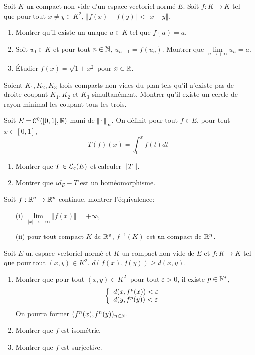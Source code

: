 \begin{exercise}
	Soit $K$ un compact non vide d'un espace vectoriel normé $E$. Soit $f\colon K\to K$ tel que pour tout $x\neq y\in K^{2}$, $\Vert f(x)-f(y)\Vert<\Vert x-y\Vert$.
	\begin{enumerate}
		\item Montrer qu'il existe un unique $a\in K$ tel que $f(a)=a$.
		\item Soit $u_{0}\in K$ et pour tout $n\in\mathbb{N}$, $u_{n+1}=f(u_{n})$. Montrer que $\lim\limits_{n\to+\infty}u_{n}=a$.
		\item Étudier $f(x)=\sqrt{1+x^{2}}$ pour $x\in\mathbb{R}$.
	\end{enumerate}
\end{exercise}

\begin{exercise}
	Soient $K_{1},K_{2},K_{3}$ trois compacts non vides du plan tels qu'il n'existe pas de droite coupant $K_{1},K_{2}$ et $K_{3}$ simultanément. Montrer qu'il existe un cercle de rayon minimal les coupant tous les trois.
\end{exercise}

\begin{exercise}
	Soit $E=\mathcal{C}^{0}([0,1],\mathbb{R})$ muni de $\Vert\cdot\Vert_{\infty}$. On définit pour tout $f\in E$, pour tout $x\in[0,1]$, 
	$$T(f)(x)=\int_{0}^{x}f(t)dt$$
	\begin{enumerate}
		\item Montrer que $T\in\mathcal{L}_{c}(E)$ et calculer ${\left\vert\kern-0.25ex\left\vert\kern-0.25ex\left\vert{}T \right\vert\kern-0.25ex\right\vert\kern-0.25ex\right\vert}$.
		\item Montrer que $id_{E}-T$ est un homéomorphisme.
	\end{enumerate}
\end{exercise}

\begin{exercise}
	Soit $f:\mathbb{R}^{n}\to\mathbb{R}^{p}$ continue, montrer l'équivalence:
	\begin{enumerate}
		\item [(i)] $\lim\limits_{\Vert x\Vert\to+\infty}\Vert f(x)\Vert=+\infty$,
		\item [(ii)] pour tout compact $K$ de $\mathbb{R}^{p}$, $f^{-1}(K)$ est un compact de $\mathbb{R}^{n}$.
	\end{enumerate}
\end{exercise}

\begin{exercise}
	Soit $E$ un espace vectoriel normé et $K$ un compact non vide de $E$ et $f:K\to K$ tel que pour tout $(x,y)\in K^{2}$, $d(f(x),f(y))\geqslant d(x,y)$.
	\begin{enumerate}
		\item Montrer que pour tout $(x,y)\in K^{2}$, pour tout $\varepsilon>0$, il existe $p\in\mathbb{N}^{*}$,
		$$
		\left\{
			\begin{array}[]{l}
				d(x,f^{p}(x))<\varepsilon\\
				d(y,f^{p}(y))<\varepsilon
			\end{array}
		\right.
		$$
		On pourra former $(f^{n}(x),f^{n}(y))_{n\in\mathbb{N}}$.
		\item Montrer que $f$ est isométrie.
		\item Montrer que $f$ est surjective.
	\end{enumerate}
\end{exercise}

